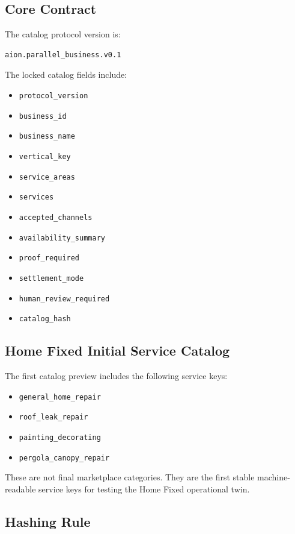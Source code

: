 \subsection{Core Contract}

The catalog protocol version is:

\begin{verbatim}
aion.parallel_business.v0.1
\end{verbatim}

The locked catalog fields include:

\begin{itemize}
  \item \texttt{protocol\_version}
  \item \texttt{business\_id}
  \item \texttt{business\_name}
  \item \texttt{vertical\_key}
  \item \texttt{service\_areas}
  \item \texttt{services}
  \item \texttt{accepted\_channels}
  \item \texttt{availability\_summary}
  \item \texttt{proof\_required}
  \item \texttt{settlement\_mode}
  \item \texttt{human\_review\_required}
  \item \texttt{catalog\_hash}
\end{itemize}

\subsection{Home Fixed Initial Service Catalog}

The first catalog preview includes the following service keys:

\begin{itemize}
  \item \texttt{general\_home\_repair}
  \item \texttt{roof\_leak\_repair}
  \item \texttt{painting\_decorating}
  \item \texttt{pergola\_canopy\_repair}
\end{itemize}

These are not final marketplace categories. They are the first stable machine-readable service keys for testing the Home Fixed operational twin.

\subsection{Hashing Rule}

